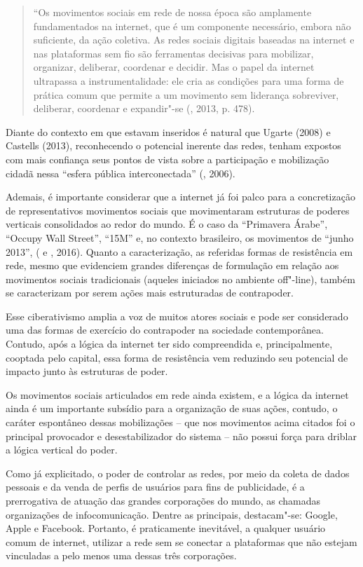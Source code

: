 \begin{quote}
``Os movimentos sociais em rede de nossa época são amplamente
fundamentados na internet, que é um componente necessário, embora não
suficiente, da ação coletiva. As redes sociais digitais baseadas na
internet e nas plataformas sem fio são ferramentas decisivas para
mobilizar, organizar, deliberar, coordenar e decidir. Mas o papel da
internet ultrapassa a instrumentalidade: ele cria as condições para uma
forma de prática comum que permite a um movimento sem liderança
sobreviver, deliberar, coordenar e expandir"-se (, 2013, p. 478).
\end{quote}

Diante do contexto em que estavam inseridos é natural que Ugarte (2008)
e Castells (2013), reconhecendo o potencial inerente das redes, tenham
expostos com mais confiança seus pontos de vista sobre a participação e
mobilização cidadã nessa ``esfera pública interconectada'' (,
2006).

Ademais, é importante considerar que a internet já foi palco para a
concretização de representativos movimentos sociais que movimentaram
estruturas de poderes verticais consolidados ao redor do mundo. É o caso
da ``Primavera Árabe'', ``Occupy Wall Street'', ``15M'' e, no contexto
brasileiro, os movimentos de ``junho 2013'', ( e , 2016).
Quanto a caracterização, as referidas formas de resistência em rede,
mesmo que evidenciem grandes diferenças de formulação em relação aos
movimentos sociais tradicionais (aqueles iniciados no ambiente
off"-line), também se caracterizam por serem ações mais estruturadas de
contrapoder.

Esse ciberativismo amplia a voz de muitos atores sociais e pode ser
considerado uma das formas de exercício do contrapoder na sociedade
contemporânea. Contudo, após a lógica da internet ter sido compreendida
e, principalmente, cooptada pelo capital, essa forma de resistência vem
reduzindo seu potencial de impacto junto às estruturas de poder.

Os movimentos sociais articulados em rede ainda existem, e a lógica da
internet ainda é um importante subsídio para a organização de suas
ações, contudo, o caráter espontâneo dessas mobilizações -- que nos
movimentos acima citados foi o principal provocador e desestabilizador
do sistema -- não possui força para driblar a lógica vertical do poder.

Como já explicitado, o poder de controlar as redes, por meio da coleta
de dados pessoais e da venda de perfis de usuários para fins de
publicidade, é a prerrogativa de atuação das grandes corporações do
mundo, as chamadas organizações de infocomunicação. Dentre as
principais, destacam"-se: Google, Apple e Facebook. Portanto, é
praticamente inevitável, a qualquer usuário comum de internet, utilizar
a rede sem se conectar a plataformas que não estejam vinculadas a pelo
menos uma dessas três corporações.

